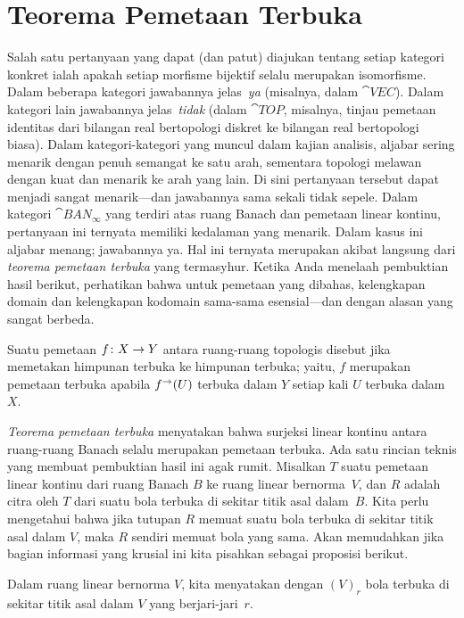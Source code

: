 \section{Teorema Pemetaan Terbuka}\label{C0694}
Salah satu pertanyaan yang dapat (dan patut) diajukan tentang setiap kategori konkret ialah apakah setiap morfisme bijektif selalu merupakan
isomorfisme.  Dalam beberapa kategori jawabannya jelas \,\emph{ya} (misalnya, dalam $\cat{VEC}$).  Dalam kategori lain
jawabannya jelas \,\emph{tidak} (dalam $\cat{TOP}$, misalnya, tinjau pemetaan identitas dari bilangan
real bertopologi diskret ke bilangan real bertopologi biasa).  Dalam kategori-kategori yang muncul dalam
kajian analisis, aljabar sering menarik dengan penuh semangat ke satu arah, sementara topologi melawan dengan kuat dan menarik
ke arah yang lain.  Di sini pertanyaan tersebut dapat menjadi sangat menarik---dan jawabannya sama sekali tidak sepele.  Dalam kategori
$\cat{BAN_\infty}$ yang terdiri atas ruang Banach dan pemetaan linear kontinu, pertanyaan ini ternyata memiliki kedalaman yang menarik.  Dalam
kasus ini aljabar menang; jawabannya ya.  Hal ini ternyata merupakan akibat langsung dari \emph{teorema
pemetaan terbuka} yang termasyhur.  Ketika Anda menelaah pembuktian hasil berikut, perhatikan bahwa untuk pemetaan yang dibahas,
kelengkapan domain dan kelengkapan kodomain sama-sama esensial---dan dengan alasan yang sangat berbeda.

\begin{defn} Suatu pemetaan $f \colon X \rightarrow Y$ antara ruang-ruang topologis disebut
 jika memetakan himpunan terbuka ke himpunan terbuka; yaitu, $f$ merupakan pemetaan terbuka apabila $f^{\rightarrow}(U)$ terbuka dalam $Y$
setiap kali $U$ terbuka dalam~$X$.
\end{defn}

\emph{Teorema pemetaan terbuka} menyatakan bahwa surjeksi linear kontinu antara ruang-ruang Banach selalu merupakan pemetaan terbuka.
Ada satu rincian teknis yang membuat pembuktian hasil ini agak rumit.  Misalkan $T$ suatu pemetaan linear kontinu
dari ruang Banach $B$ ke ruang linear bernorma~$V$, dan $R$ adalah citra oleh $T$ dari suatu bola terbuka di sekitar
titik asal dalam~$B$.  Kita perlu mengetahui bahwa jika tutupan $R$ memuat suatu bola terbuka di sekitar titik asal dalam $V$, maka
$R$ sendiri memuat bola yang sama. Akan memudahkan jika bagian informasi yang krusial ini kita pisahkan sebagai proposisi berikut.

\begin{notn} Dalam ruang linear bernorma $V$, kita menyatakan dengan
$(V)_r$ bola terbuka di sekitar titik asal dalam $V$ yang berjari-jari~$r$.
\end{notn}

